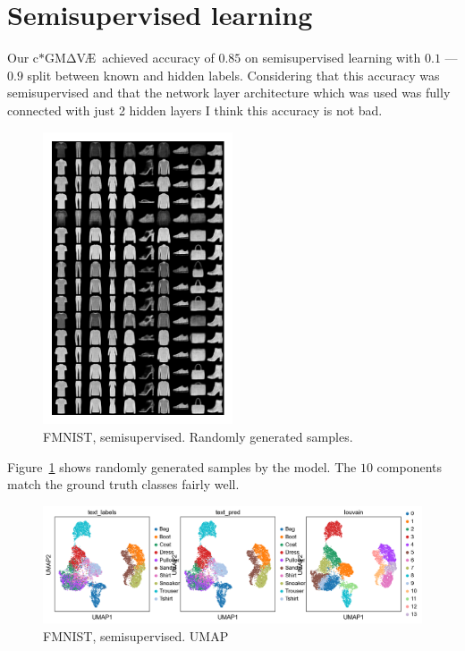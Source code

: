 \documentclass[11pt, a4paper]{report}
\theoremstyle{plain}
\theoremstyle{definition}
\theoremstyle{remark}
\newcommand{\gmvae}{c$\ast$GM$\mathrm{\Delta}$V\AE~}
\begin{document}
\section{Semisupervised learning}

Our \gmvae achieved accuracy of $0.85$ on semisupervised learning with
$0.1$ --- $0.9$ split between known and hidden labels. 
Considering that this accuracy was semisupervised and that the network 
layer architecture which was used was fully connected with just 2 hidden layers 
I think this accuracy is not bad.

\begin{figure}[h]
\centering
\includegraphics[width=0.5\textwidth]{images/gmmvae_fmnist_ss_samples.png}
\caption{FMNIST, semisupervised. Randomly generated samples.}
\label{fig:fmnist_ss_samples}
\end{figure}

Figure~\ref{fig:fmnist_ss_samples} shows randomly generated samples 
by the model. The $10$ components match the ground truth classes
fairly well.

\begin{figure}[h]
\centering
\includegraphics[width=1.1\textwidth]{images/gmmvae_fmnist_ss_latent_umap.png}
\caption{FMNIST, semisupervised. UMAP}
\label{fig:fmnist_ss_latent}
\end{figure}
\end{document}
